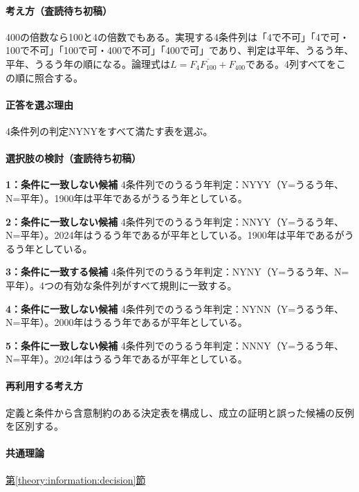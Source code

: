 \paragraph{考え方（査読待ち初稿）} 400の倍数なら100と4の倍数でもある。実現する4条件列は「4で不可」「4で可・100で不可」「100で可・400で不可」「400で可」であり、判定は平年、うるう年、平年、うるう年の順になる。論理式は\(L=F_4\overline{F_{100}}+F_{400}\)である。4列すべてをこの順に照合する。

\paragraph{正答を選ぶ理由} 4条件列の判定NYNYをすべて満たす表を選ぶ。

\paragraph{選択肢の検討（査読待ち初稿）}\mbox{}\par

\noindent\textbf{1：条件に一致しない候補} 4条件列でのうるう年判定：NYYY（Y=うるう年、N=平年）。1900年は平年であるがうるう年としている。\par

\noindent\textbf{2：条件に一致しない候補} 4条件列でのうるう年判定：NNYY（Y=うるう年、N=平年）。2024年はうるう年であるが平年としている。1900年は平年であるがうるう年としている。\par

\noindent\textbf{3：条件に一致する候補} 4条件列でのうるう年判定：NYNY（Y=うるう年、N=平年）。4つの有効な条件列がすべて規則に一致する。\par

\noindent\textbf{4：条件に一致しない候補} 4条件列でのうるう年判定：NYNN（Y=うるう年、N=平年）。2000年はうるう年であるが平年としている。\par

\noindent\textbf{5：条件に一致しない候補} 4条件列でのうるう年判定：NNNY（Y=うるう年、N=平年）。2024年はうるう年であるが平年としている。\par

\paragraph{再利用する考え方} 定義と条件から含意制約のある決定表を構成し、成立の証明と誤った候補の反例を区別する。

\paragraph{共通理論} \hyperref[theory:information:decision]{第\ref*{theory:information:decision}節}

